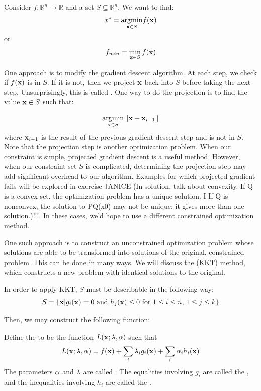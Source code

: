 Consider $f:\mathbb{R}^n\rightarrow\mathbb{R}$ and a set $S \subseteq \mathbb{R}^n$. We want to find:
$$x^*=\underset{\vx \in S}{\argmin} f(\vx)$$
or 
$$f_{min} = \min_{\vx \in S} f(\vx)$$

One approach is to modify the gradient descent algorithm. At each step, we check if $f(\vx)$ is in $S$. If it is not, then we project $\vx$ back into $S$ before taking the next step. Unsurprisingly, this is called . One way to do the projection is to find the value $\vx\in S$ such that:

$$ \underset{\vx \in S}{\argmin} \norm{\vx - \vx_{i-1}}$$
where $\vx_{i-1}$ is the result of the previous gradient descent step and is not in $S$. \\

Note that the projection step is another optimization problem. When our constraint is simple, projected gradient descent is a useful method. However, when our constraint set $S$ is complicated, determining the projection step may add significant overhead to our algorithm. Examples for which projected gradient fails will be explored in exercise JANICE (In solution, talk about convexity. If Q is a convex set, the optimization problem has a unique solution.
I If Q is nonconvex, the solution to PQ(x0) may not be unique: it gives
more than one solution.)!!!. In these cases, we'd hope to use a different constrained optimization method. 

One such approach is to construct an unconstrained optimization problem whose solutions are able to be transformed into solutions of the original, constrained problem. This can be done in many ways. We will discuss the  (KKT) method, which constructs a new problem with identical solutions to the original.

In order to apply KKT, $S$ must be describable in the following way:
$$S = \{\vx | g_i(\vx)=0 \textrm{ and } h_j(\vx) \leq 0 \textrm{ for  }1\leq i \leq n \textrm{, } 1\leq j\leq k\}$$

Then, we may construct the following function:

\begin{definition}
Define the  to be the function $L(\vx;\vlambda,\valpha)$ such that
$$L(\vx;\vlambda,\valpha) = f(\vx) + \sum_{i} \lambda_{i} g_{i}(\vx) + \sum_{i} \alpha_{i} h_{i}(\vx)$$
The parameters $\valpha$ and $\vlambda$ are called  . The equalities involving $g_{i}$ are called the , and the inequalities involving $h_{i}$ are called the .
\end{definition}

